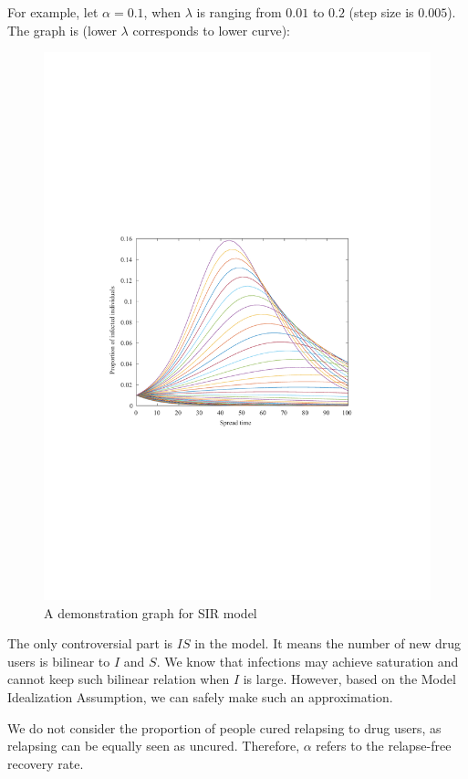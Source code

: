 \documentclass{mcmthesis}
\begin{document}
For example, let $\alpha=0.1$, when $\lambda$ is ranging from $0.01$ to $0.2$ (step size is $0.005$). The graph is (lower $\lambda$ corresponds to lower curve):
\begin{figure}[htbp!]
	\centering
	\includegraphics{SIRpdf}
	\caption{A demonstration graph for SIR model}
\end{figure}


The only controversial part is $IS$ in the model. It means the number of new drug users is bilinear to $I$ and $S$. We know that infections may achieve saturation and cannot keep such bilinear relation when $I$ is large. However, based on the Model Idealization Assumption, we can safely make such an approximation.

We do not consider the proportion of people cured relapsing to drug users, as relapsing can be equally seen as uncured. Therefore, $\alpha$ refers to the relapse-free recovery rate.
\end{document}
